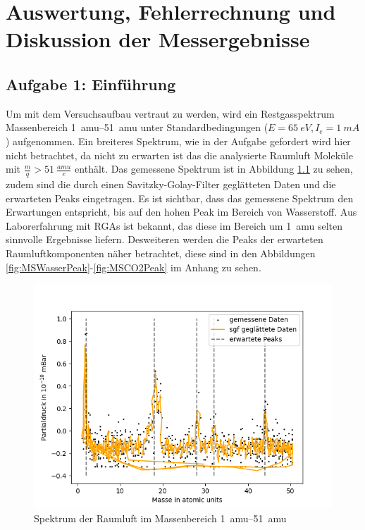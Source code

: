 \chapter{Auswertung, Fehlerrechnung und Diskussion der Messergebnisse}
\section{Aufgabe 1: Einführung}
Um mit dem Versuchsaufbau vertraut zu werden, wird ein Restgasspektrum Massenbereich \SIrange{1}{51}{amu} unter Standardbedingungen ($E = \SI{65}{eV},I_e =\SI{1}{mA}$) aufgenommen. Ein breiteres Spektrum, wie in der Aufgabe gefordert wird hier nicht betrachtet, da nicht zu erwarten ist das die analysierte Raumluft Moleküle mit $\frac{m}{q} > \SI{51}{\frac{amu}{e}}$ enthält. Das gemessene Spektrum ist  
in Abbildung \ref{fig:MSbreitspektrum} zu sehen, zudem sind die durch einen Savitzky-Golay-Filter geglätteten Daten und die erwarteten Peaks eingetragen. Es ist sichtbar, dass das gemessene Spektrum den Erwartungen entspricht, bis auf den hohen Peak im Bereich von Wasserstoff. Aus Laborerfahrung mit RGAs ist bekannt, das diese im Bereich um \SI{1}{amu} selten sinnvolle Ergebnisse liefern. Desweiteren werden die Peaks der erwarteten Raumluftkomponenten näher betrachtet, diese sind in den Abbildungen \ref{fig:MSWasserPeak}-\ref{fig:MSCO2Peak} im Anhang zu sehen.  

\begin{figure}[H]
    \centering
    \includegraphics[width=140mm,scale=0.8]{Massenspektrometer/include/MSBreitspektrum.png}
    \caption{Spektrum der Raumluft im Massenbereich \SIrange[]{1}{51}{amu}}
    \label{fig:MSbreitspektrum}
\end{figure}

